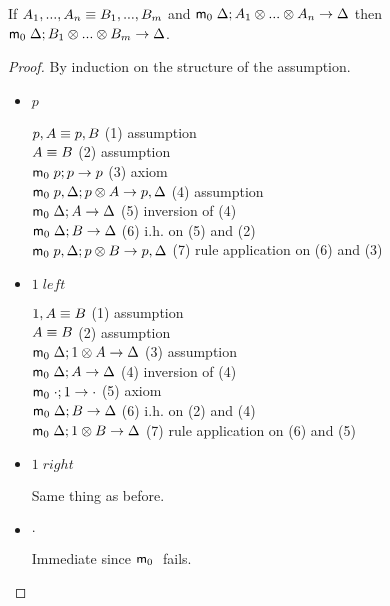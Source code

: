 If $A_1, ..., A_n \equiv B_1, ..., B_m$ and $\mathsf{m}_0 \; \Delta; A_1 \otimes ... \otimes A_n \rightarrow \Delta$ then $\mathsf{m}_0 \; \Delta; B_1 \otimes ... \otimes B_m \rightarrow \Delta$.

\begin{proof}
   By induction on the structure of the assumption.
   
   \begin{itemize}
      \item $p$
      
      $p, A \equiv p, B$ \hfill (1) assumption \\
      $A \equiv B$ \hfill (2) assumption \\
      $\mathsf{m}_0 \; p; p \rightarrow p$ \hfill (3) axiom \\
      $\mathsf{m}_0 \; p, \Delta; p \otimes A \rightarrow p, \Delta$ \hfill (4) assumption \\
      $\mathsf{m}_0 \; \Delta; A \rightarrow \Delta$ \hfill (5) inversion of (4) \\
      $\mathsf{m}_0 \; \Delta; B \rightarrow \Delta$ \hfill (6) i.h. on (5) and (2) \\
      $\mathsf{m}_0 \; p, \Delta; p \otimes B \rightarrow p, \Delta$ \hfill (7) rule application on (6) and (3) \\
      
      \item $1 \; left$
      
      $1, A \equiv B$ \hfill (1) assumption \\
      $A \equiv B$ \hfill (2) assumption \\
      $\mathsf{m}_0 \; \Delta; 1 \otimes A \rightarrow \Delta$ \hfill (3) assumption \\
      $\mathsf{m}_0 \; \Delta; A \rightarrow \Delta$ \hfill (4) inversion of (4) \\
      $\mathsf{m}_0 \; \cdot; 1 \rightarrow \cdot$ \hfill (5) axiom \\
      $\mathsf{m}_0 \; \Delta; B \rightarrow \Delta$ \hfill (6) i.h. on (2) and (4) \\
      $\mathsf{m}_0 \; \Delta; 1 \otimes B \rightarrow \Delta$ \hfill (7) rule application on (6) and (5) \\
      
      \item $1 \; right$
      
      Same thing as before.
      
      \item $\cdot$
      
      Immediate since $\mathsf{m}_0 \;$ fails.
      

\end{itemize}
\end{proof}
